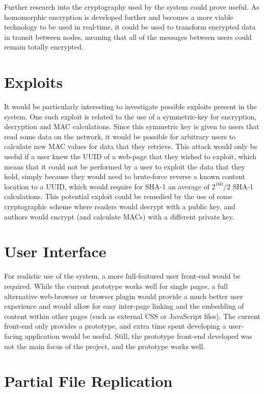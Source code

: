 Further research into the cryptography used by the system could prove useful.
As homomorphic encryption is developed further and becomes a more viable technology to be
used in real-time, it could be used to transform encrypted data in transit between nodes,
meaning that all of the messages between users could remain totally encrypted.

\section{Exploits}

It would be particularly interesting to investigate possible exploits present in the
system. One such exploit is related to the use of a symmetric-key for encryption,
decryption and MAC calculations. Since this symmetric key is given to users that read
some data on the network, it would be possible for arbitrary users to calculate new
MAC values for data that they retrieve. This attack would only be useful if a user
knew the UUID of a web-page that they wished to exploit, which means that it could
not be performed by a user to exploit the data that they hold, simply because they
would need to brute-force reverse a known content location to a UUID, which would
require for SHA-1 an average of $2^{160} / 2$ SHA-1 calculations.
This potential exploit could be remedied by the use of some cryptographic scheme where
readers would decrypt with a public key, and authors would encrypt (and calculate MACs)
with a different private key.

\section{User Interface}

For realistic use of the system, a more full-featured user front-end would be required.
While the current prototype works well for single pages, a full alternative web-browser
or browser plugin would provide a much better user experience and would allow for easy
inter-page linking and the embedding of content within other pages (such as external
CSS or JavaScript files). The current front-end only provides a prototype, and extra
time spent developing a user-facing application would be useful. Still, the prototype
front-end developed was not the main focus of the project, and the prototype works
well.

\section{Partial File Replication}

